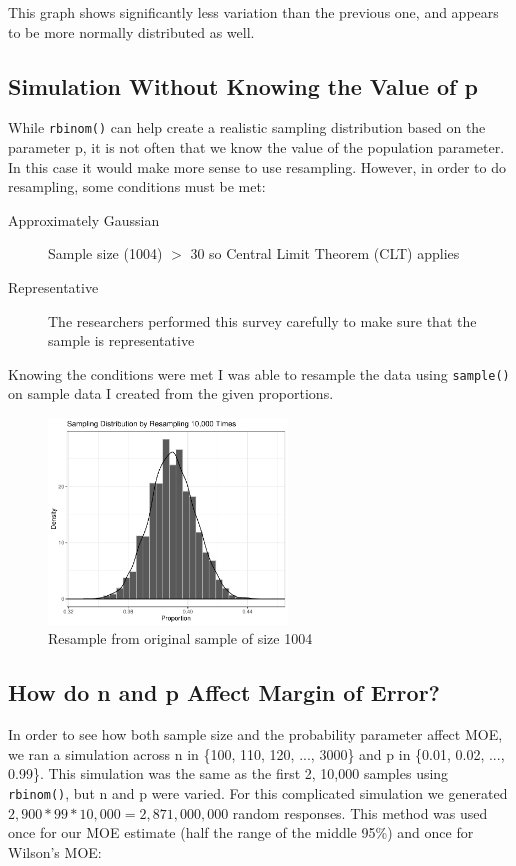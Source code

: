 \documentclass{article}\usepackage[]{graphicx}\usepackage[]{xcolor}
\begin{document}
\begin{multicols}{2}
This graph shows significantly less variation than the previous one, and appears to be more normally distributed as well. 

\subsection{Simulation Without Knowing the Value of p}

While \texttt{rbinom()} can help create a realistic sampling distribution based on the parameter p, it is not often that we know the value of the population parameter. In this case it would make more sense to use resampling. However, in order to do resampling, some conditions must be met:

\begin{description}
  \item[Approximately Gaussian] Sample size (1004) $>$ 30 so Central Limit Theorem (CLT) applies
  \item[Representative] The researchers performed this survey carefully to make sure that the sample is representative
\end{description}

Knowing the conditions were met I was able to resample the data using \texttt{sample()} on sample data I created from the given proportions. 

\begin{figure}[H]
\label{p3}
\centering
\includegraphics[width=2.5in]{resample.pdf}
\caption{Resample from original sample of size 1004}
\end{figure}


\subsection{How do n and p Affect Margin of Error?}

In order to see how both sample size and the probability parameter affect MOE, we ran a simulation across n in \{100, 110, 120, ..., 3000\} and p in \{0.01, 0.02, ..., 0.99\}. This simulation was the same as the first 2, 10,000 samples using \texttt{rbinom()}, but n and p were varied. For this complicated simulation we generated $2,900*99*10,000 = 2,871,000,000$ random responses. This method was used once for our MOE estimate (half the range of the middle 95\%) and once for Wilson's MOE:


\end{multicols}
\end{document}
